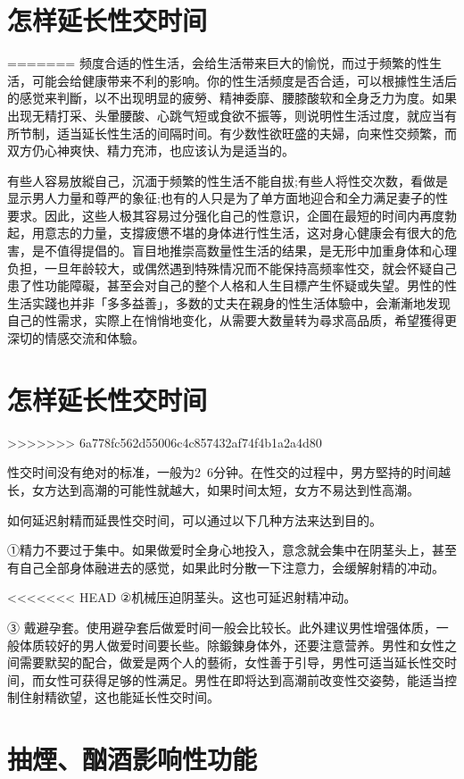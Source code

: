 \documentclass[12pt,UTF8]{ctexbook}
\begin{document}
\section{怎样延长性交时间}
=======
频度合适的性生活，会给生活带来巨大的愉悦，而过于频繁的性生活，可能会给健康带来不利的影响。你的性生活频度是否合适，可以根據性生活后的感觉来判斷，以不出现明显的疲勞、精神委靡、腰膝酸软和全身乏力为度。如果出现无精打采、头暈腰酸、心跳气短或食欲不振等，则说明性生活过度，就应当有所节制，适当延长性生活的间隔时间。有少数性欲旺盛的夫婦，向来性交频繁，而双方仍心神爽快、精力充沛，也应该认为是适当的。

有些人容易放縱自己，沉湎于频繁的性生活不能自拔;有些人将性交次数，看做是显示男人力量和尊严的象征;也有的人只是为了单方面地迎合和全力满足妻子的性要求。因此，这些人极其容易过分强化自己的性意识，企圖在最短的时间内再度勃起，用意志的力量，支撐疲憊不堪的身体进行性生活，这对身心健康会有很大的危害，是不值得提倡的。盲目地推崇高数量性生活的结果，是无形中加重身体和心理负担，一旦年龄较大，或偶然遇到特殊情况而不能保持高频率性交，就会怀疑自己患了性功能障礙，甚至会对自己的整个人格和人生目標产生怀疑或失望。男性的性生活实踐也并非「多多益善」，多数的丈夫在親身的性生活体驗中，会漸漸地发现自己的性需求，实際上在悄悄地变化，从需要大数量转为尋求高品质，希望獲得更深切的情感交流和体驗。

\section{怎样延长性交时间}
>>>>>>> 6a778fc562d55006c4c857432af74f4b1a2a4d80

性交时间没有绝对的标准，一般为2~6分钟。在性交的过程中，男方堅持的时间越长，女方达到高潮的可能性就越大，如果时间太短，女方不易达到性高潮。

如何延迟射精而延畏性交时间，可以通过以下几种方法来达到目的。

①精力不要过于集中。如果做爱时全身心地投入，意念就会集中在阴茎头上，甚至有自己全部身体融进去的感觉，如果此时分散一下注意力，会缓解射精的冲动。

<<<<<<< HEAD
②机械压迫阴茎头。这也可延迟射精冲动。

③ 戴避孕套。使用避孕套后做爱时间一般会比较长。此外建议男性增强体质，一般体质较好的男人做爱时间要长些。除鍛鍊身体外，还要注意营养。男性和女性之间需要默契的配合，做爱是两个人的藝術，女性善于引导，男性可适当延长性交时间，而女性可获得足够的性满足。男性在即将达到高潮前改变性交姿勢，能适当控制住射精欲望，这也能延长性交时间。

\section{抽煙、酗酒影响性功能}
\end{document}
